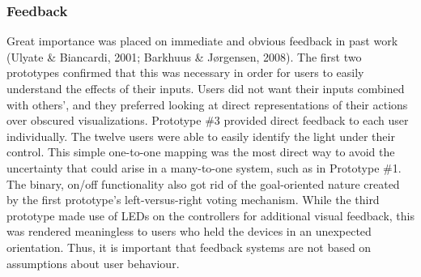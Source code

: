 
\subsubsection{Feedback}

Great importance was placed on immediate and obvious feedback in past work (Ulyate \& Biancardi, 2001; Barkhuus \& J{\o}rgensen, 2008). The first two prototypes confirmed that this was necessary in order for users to easily understand the effects of their inputs. Users did not want their inputs combined with others', and they preferred looking at direct representations of their actions over obscured visualizations. Prototype \#3 provided direct feedback to each user individually. The twelve users were able to easily identify the light under their control. This simple one-to-one mapping was the most direct way to avoid the uncertainty that could arise in a many-to-one system, such as in Prototype \#1. The binary, on/off functionality also got rid of the goal-oriented nature created by the first prototype's left-versus-right voting mechanism. While the third prototype made use of LEDs on the controllers for additional visual feedback, this was rendered meaningless to users who held the devices in an unexpected orientation. Thus, it is important that feedback systems are not based on assumptions about user behaviour.

